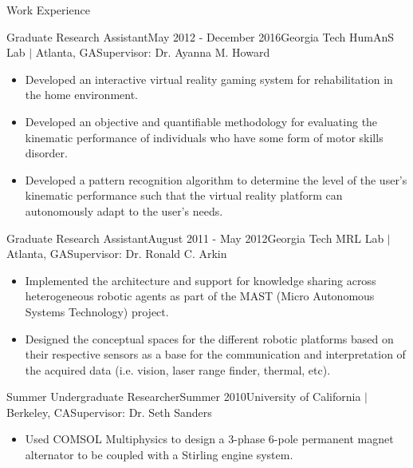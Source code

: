 \documentclass{resume} %
\begin{document}
\begin{rSection}{Work Experience}
\begin{rSubsection}{Graduate Research Assistant}{May 2012 - December 2016}{Georgia Tech HumAnS Lab $\vert$ Atlanta, GA}{Supervisor: Dr. Ayanna M. Howard}
\item
\begin{itemize}
\item Developed an interactive virtual reality gaming system for rehabilitation
  in the home environment.

\item Developed an objective and quantifiable methodology for evaluating the
  kinematic performance of individuals who have some form of motor skills
  disorder.

\item Developed a pattern recognition algorithm to determine the level of the
  user's kinematic performance such that the virtual reality platform can
  autonomously adapt to the user's needs.

\end{itemize}

\end{rSubsection}


\begin{rSubsection}{Graduate Research Assistant}{August 2011 - May 2012}{Georgia Tech MRL Lab $\vert$ Atlanta, GA}{Supervisor: Dr. Ronald C. Arkin}

\item
\begin{itemize}

\item Implemented the architecture and support for knowledge sharing across
  heterogeneous robotic agents as part of the MAST (Micro Autonomous Systems
  Technology) project.

\item Designed the conceptual spaces for the different robotic platforms based
  on their respective sensors as a base for the communication and interpretation
  of the acquired data (i.e. vision, laser range finder, thermal, etc).

\end{itemize}

\end{rSubsection}


\begin{rSubsection}{Summer Undergraduate Researcher}{Summer 2010}{University of California $\vert$ Berkeley, CA}{Supervisor: Dr. Seth Sanders}

\item
\begin{itemize}
\item Used COMSOL Multiphysics to design a 3-phase 6-pole permanent magnet
  alternator to be coupled with a Stirling engine system.
\end{itemize}


\end{rSubsection}
\end{rSection}
\end{document}
